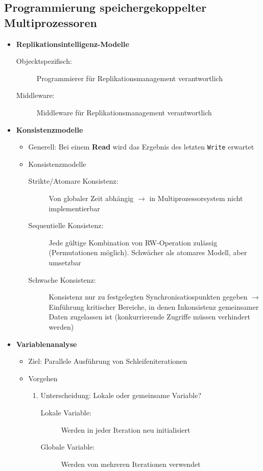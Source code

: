 \subsection{Programmierung speichergekoppelter Multiprozessoren}
\begin{itemize}
	\item \textbf{Replikationsintelligenz-Modelle}
	\begin{description}
		\item[Objecktspezifisch:] Programmierer für Replikationsmanagement verantwortlich
		\item[Middleware:] Middleware für Replikationsmanagement verantwortlich
	\end{description}
	\item \textbf{Konsistenzmodelle}
	\begin{itemize}
		\item Generell: Bei einem \textbf{Read} wird das Ergebnis des letzten \texttt{Write} erwartet
		\item Konsistenzmodelle
		\begin{description}
			\item[Strikte/Atomare Konsistenz:] Von globaler Zeit abhängig \(\rightarrow\) in Multiprozessorsystem nicht implementierbar
			\item[Sequentielle Konsistenz:] Jede gültige Kombination von RW-Operation zulässig (Permutationen möglich). Schwächer als atomares Modell, aber umsetzbar
			\item[Schwache Konsistenz:] Konsistenz nur zu festgelegten Synchronisatiospunkten gegeben \(\rightarrow\) Einführung kritischer Bereiche, in denen Inkonsistenz gemeinsamer Daten zugelassen ist (konkurrierende Zugriffe müssen verhindert werden)
		\end{description}
	\end{itemize}
	\item \textbf{Variablenanalyse}
	\begin{itemize}
		\item Ziel: Parallele Ausführung von Schleifeniterationen
		\item Vorgehen
		\begin{enumerate}
			\item Unterscheidung: Lokale oder gemeinsame Variable?
			\begin{description}
				\item[Lokale Variable:] Werden in jeder Iteration neu initialisiert
				\item[Globale Variable:] Werden von mehreren Iterationen verwendet

\end{description}
\end{enumerate}
\end{itemize}
\end{itemize}
